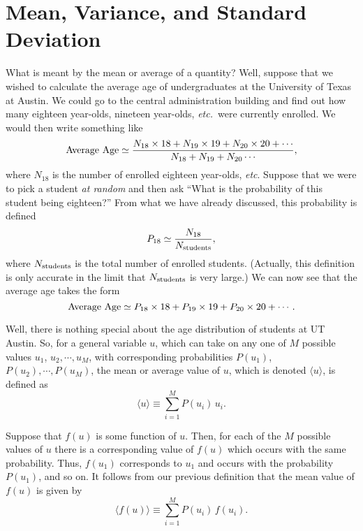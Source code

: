 \section{Mean, Variance, and Standard Deviation}
What is meant by the mean or average of a quantity? Well, suppose that we
wished to calculate  the average age of undergraduates at the University of Texas at Austin.
We could go to the central administration building and find
out how many eighteen year-olds, nineteen year-olds, {\em etc.}\ were currently
enrolled. We would then write something like
\begin{equation}
{\rm Average~Age} \simeq \frac{N_{18}\times 18 + N_{19}\times 19 +N_{20}
\times 20+\cdots}
{N_{18}+N_{19}+N_{20}\cdots},
\end{equation}
where $N_{18}$ is the number of enrolled eighteen year-olds, {\em etc}.
Suppose that we were to pick a student {\em at random} and then ask ``What is
the probability of this student being eighteen?'' From what we have
already discussed, this probability is defined
\begin{equation}
P_{18} \simeq
\frac{N_{18}}{N_{\rm students}},
\end{equation}
where $N_{\rm students}$ is the total number of enrolled
students. (Actually, this definition is only accurate in the limit that $N_{\rm students}$ is very
large.)
 We can now see that the average age takes
the form
\begin{equation}
{\rm Average~Age} \simeq P_{18}\times 18 + P_{19}\times 19 + P_{20}\times 20
+\cdots.
\end{equation}

Well, there is nothing special about the age distribution of students
at UT Austin. So, for a general variable $u$, which can take on any one of $M$
possible values $u_1$, $u_2, \cdots, u_M$, with  corresponding probabilities
$P(u_1)$, $P(u_2),\cdots, P(u_M)$,
the mean or average value of $u$, which
is denoted $\langle u\rangle$, is defined as
\begin{equation}\label{dmean}
\langle u\rangle \equiv \sum_{i=1}^{M} P(u_i)\, u_i.
\end{equation}

Suppose that $f(u)$ is some function of  $u$. Then, for each of
 the $M$ possible values of $u$ there is a corresponding value 
of $f(u)$ which occurs with the same probability.  Thus, $f(u_1)$ corresponds
to $u_1$ and occurs with the probability $P(u_1)$, and so on. It follows from
our previous definition  that the mean value of $f(u)$ is
given by
\begin{equation}
\langle f(u)\rangle \equiv \sum_{i=1}^{M} P(u_i)\, f(u_i).
\end{equation} 

